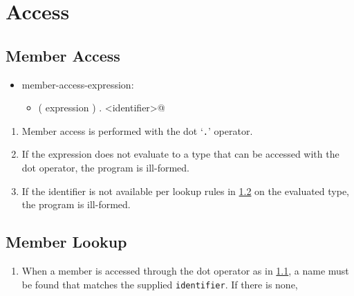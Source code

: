 \section{Access}

\subsection{Member Access}\label{ssec: Member Access}
\begin{itemize}[before=\itshape, label={}]
	\item member-access-expression:
	\begin{itemize}[before=\itshape, label={}]
		\item \lstinline@( expression ) . <identifier>@
	\end{itemize}
\end{itemize}
\begin{enumerate}
	\item Member access is performed with the dot `\lstinline|.|' operator.
	\item If the expression does not evaluate to a type that can be accessed with the dot operator, the program is ill-formed.
	\item If the identifier is not available per lookup rules in \ref{ssec: Member Lookup} on the evaluated type, the program is ill-formed.
\end{enumerate}

\subsection{Member Lookup}\label{ssec: Member Lookup}
\begin{enumerate}
	\item When a member is accessed through the dot operator as in \ref{ssec: Member Access}, a name must be found that matches the supplied \lstinline|identifier|. If there is none,
\end{enumerate}

